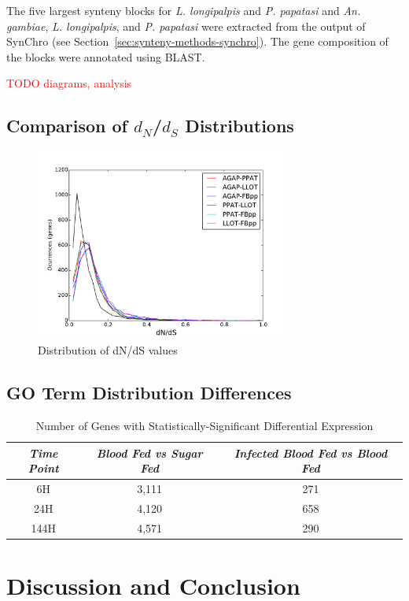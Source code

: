 The five largest synteny blocks for \emph{L. longipalpis} and \emph{P. papatasi} and \emph{An. gambiae}, \emph{L. longipalpis}, and \emph{P. papatasi} were extracted from the output of SynChro (see Section~\ref{sec:synteny-methods-synchro}).  The gene composition of the blocks were annotated using BLAST.

\textcolor{red}{TODO diagrams, analysis}

\subsection{Comparison of $d_N$/$d_S$ Distributions}
\begin{figure}[H]
  \centering
  \includegraphics[width=0.75\textwidth]{figures/ka_ks/dN_dS}
  \caption{Distribution of dN/dS values}
  \label{fig:dnds-distr}
\end{figure}

\subsection{GO Term Distribution Differences}

\begin{table}[H]
  \centering
  \begin{tabular}{c c c} \hline
  \emph{Time Point} & \emph{Blood Fed vs Sugar Fed} & \emph{Infected Blood Fed vs Blood Fed} \\ \hline
  6H & 3,111 & 271 \\ \hline
  24H & 4,120 & 658 \\ \hline
  144H & 4,571 & 290 \\ \hline
  \end{tabular}
  \caption{Number of Genes with Statistically-Significant Differential Expression}
  \label{tab:stat-sig-genes}
\end{table}

\section{Discussion and Conclusion}

